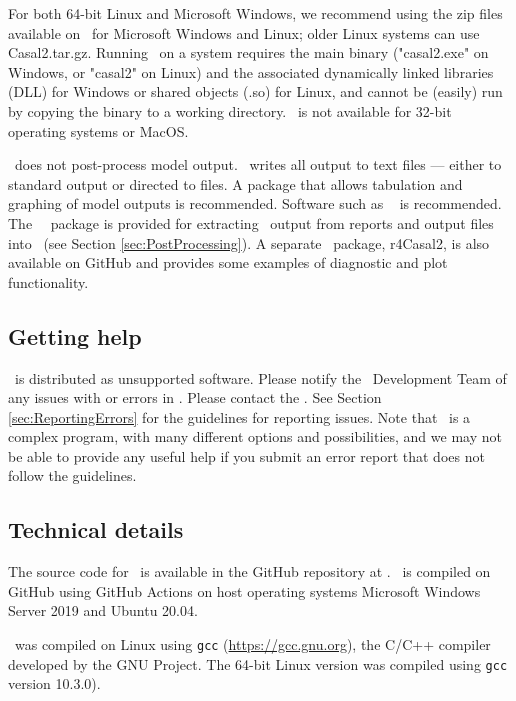 For both 64-bit Linux and Microsoft Windows, we recommend using the zip files available on \github\ for Microsoft Windows and Linux; older Linux systems can use Casal2.tar.gz. Running \CNAME\ on a system requires the main binary ("casal2.exe" on Windows, or "casal2" on Linux) and the associated dynamically linked libraries (DLL) for Windows or shared objects (.so) for Linux, and cannot be (easily) run by copying the binary to a working directory. \CNAME\ is not available for 32-bit operating systems or MacOS.

\CNAME\ does not post-process model output. \CNAME\ writes all output to text files --- either to standard output or directed to files. A package that allows tabulation and graphing of model outputs is recommended. Software such as \href{http://www.r-project.org}{\R}\ \citep{R} is recommended. The \CNAME\ \R\ package is provided for extracting \CNAME\ output from reports and output files into \R\ (see Section \ref{sec:PostProcessing}). A separate \R\ package, r4Casal2, is also available on GitHub and provides some examples of diagnostic and plot functionality.

\subsection{Getting help}

\CNAME\ is distributed as unsupported software. Please notify the \CNAME\ Development Team of any issues with or errors in \CNAME. Please contact the \emaillink. See Section \ref{sec:ReportingErrors} for the guidelines for reporting issues. Note that \CNAME\ is a complex program, with many different options and possibilities, and we may not be able to provide any useful help if you submit an error report that does not follow the guidelines.

\subsection{Technical details}\label{sec:TechnicalDetails}

The source code for \CNAME\ is available in the GitHub repository at \github. \CNAME\ is compiled on GitHub using GitHub Actions on host operating systems Microsoft Windows Server 2019 and Ubuntu 20.04.

\CNAME\ was compiled on Linux using \texttt{gcc} (\url{https://gcc.gnu.org}), the C/C++ compiler developed by the GNU Project. The 64-bit Linux  version was compiled using \texttt{gcc} version 10.3.0). 

